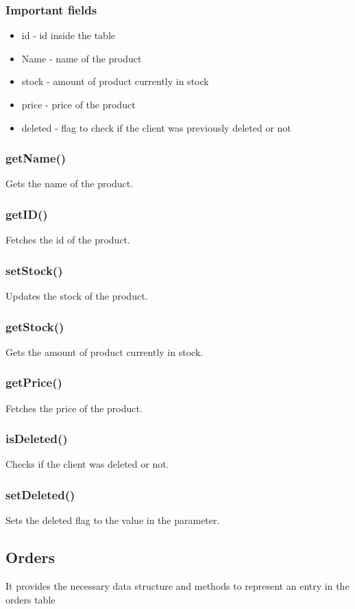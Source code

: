 \documentclass[10pt,a4paper]{article}
\begin{document}
\subsubsection{Important fields}
\begin{itemize}
\item id - id inside the table
\item Name - name of the product
\item stock - amount of product currently in stock
\item price - price of the product
\item deleted - flag to check if the client was previously deleted or not
\end{itemize}
\subsubsection{getName()}
Gets the name of the product.
\subsubsection{getID()}
Fetches the id of the product.
\subsubsection{setStock()}
Updates the stock of the product.
\subsubsection{getStock()}
Gets the amount of product currently in stock.
\subsubsection{getPrice()}
Fetches the price of the product.
\subsubsection{isDeleted()}
Checks if the client was deleted or not.
\subsubsection{setDeleted()}
Sets the deleted flag to the value in the parameter.

\subsection{Orders}
It provides the necessary data structure and methods to represent an entry in the orders table
\end{document}
